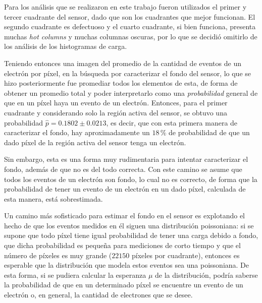 Para los análisis que se realizaron en este trabajo fueron utilizados el primer y tercer cuadrante del sensor, dado que son los cuadrantes que mejor funcionan. El segundo cuadrante es defectuoso y el cuarto cuadrante, si bien funciona, presenta muchas \textit{hot columns} y muchas columnas oscuras, por lo que se decidió omitirlo de los análisis de los histogramas de carga.


Teniendo entonces una imagen del promedio de la cantidad de eventos de un electrón por píxel, en la búsqueda por caracterizar el fondo del sensor, lo que se hizo posteriormente fue promediar todos los elementos de esta, de forma de obtener un promedio total y poder interpretarlo como una \textit{probabilidad} general de que en un píxel haya un evento de un electrón. Entonces, para el primer cuadrante y considerando solo la región activa del sensor, se obtuvo una probabilidad $\hat{p} = 0.1802 \pm 0.0213$, es decir, que con esta primera manera de caracterizar el fondo, hay aproximadamente un $18\,\%$ de probabilidad de que un dado píxel de la región activa del sensor tenga un electrón.

Sin embargo, esta es una forma muy rudimentaria para intentar caracterizar el fondo, además de que no es del todo correcta. Con este camino se asume que todos los eventos de un electrón son fondo, lo cual no es correcto, de forma que la probabilidad de tener un evento de un electrón en un dado píxel, calculada de esta manera, está sobrestimada. 

Un camino más sofisticado para estimar el fondo en el sensor es explotando el hecho de que los eventos medidos en él siguen una distribución poissoniana: si se supone que todo píxel tiene igual probabilidad de tener una carga debido a fondo, que dicha probabilidad es pequeña para mediciones de corto tiempo y que el número de píxeles es muy grande ($22150$ píxeles por cuadrante), entonces es esperable que la distribución que modela estos eventos sea una poissoniana. De esta forma, si se pudiera calcular la esperanza $\mu$ de la distribución, podría saberse la probabilidad de que en un determinado píxel se encuentre un evento de un electrón o, en general, la cantidad de electrones que se desee.

